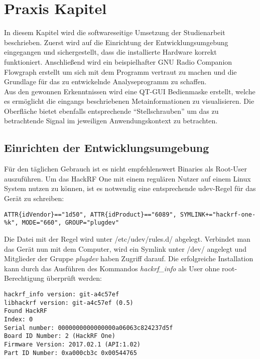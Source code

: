 
\chapter{Praxis Kapitel}
\label{kap4}
In diesem Kapitel wird die softwareseitige Umsetzung der Studienarbeit beschrieben. Zuerst wird auf die Einrichtung der Entwicklungsumgebung eingegangen und sichergestellt, dass die installierte Hardware korrekt funktioniert. Anschließend wird ein beispielhafter GNU Radio Companion Flowgraph erstellt um sich mit dem Programm vertraut zu machen und die Grundlage für das zu entwickelnde Analyseprogramm zu schaffen.\\
Aus den gewonnen Erkenntnissen wird eine QT-GUI Bedienmaske erstellt, welche es ermöglicht die eingangs beschriebenen Metainformationen zu visualisieren. Die Oberfläche bietet ebenfalls entsprechende \enquote{Stellschrauben} um das zu betrachtende Signal im jeweiligen Anwendungskontext zu betrachten. 


\section{Einrichten der Entwicklungsumgebung}
Für den täglichen Gebrauch ist es nicht empfehlenswert Binaries als Root-User auszuführen. Um das HackRF One mit einem regulären Nutzer auf einem Linux System nutzen zu können, ist es notwendig eine entsprechende udev-Regel für das Gerät zu schreiben:

\begin{lstlisting}[caption=Erstellen einer udev-Regel, label=udev]
ATTR{idVendor}=="1d50", ATTR{idProduct}=="6089", SYMLINK+="hackrf-one-%k", MODE="660", GROUP="plugdev"
\end{lstlisting}

Die Datei mit der Regel wird unter /etc/udev/rules.d/ abgelegt. Verbindet man das Gerät nun mit dem Computer, wird ein Symlink unter /dev/ angelegt und Mitglieder der Gruppe \textit{plugdev} haben Zugriff darauf. 
Die erfolgreiche Installation kann durch das Ausführen des Kommandos \textit{hackrf\_info} als User ohne root-Berechtigung überprüft werden:
\begin{lstlisting}[caption=Das Kommando "hackrf\_info" wird zum Test auf dem System ausgeführt, label=hackrfinfo]
hackrf_info version: git-a4c57ef
libhackrf version: git-a4c57ef (0.5)
Found HackRF
Index: 0
Serial number: 0000000000000000a06063c824237d5f
Board ID Number: 2 (HackRF One)
Firmware Version: 2017.02.1 (API:1.02)
Part ID Number: 0xa000cb3c 0x00544765
\end{lstlisting}

